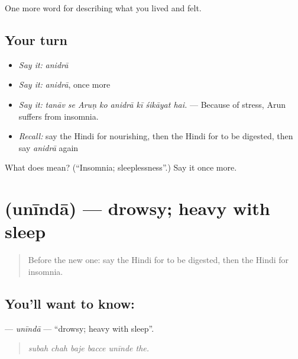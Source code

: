 \begin{grammarlens}[title={What you've built}]
One more word for describing what you lived and felt.
\end{grammarlens}

\subsection*{Your turn}
\begin{itemize}
\raggedright
  \item \emph{Say it:} \emph{anidrā}
  \item \emph{Say it:} \emph{anidrā}, once more
  \item \emph{Say it:} \emph{tanāv se Aruṇ ko anidrā kī śikāyat hai.} — Because of stress, Arun suffers from insomnia.
  \item \emph{Recall:} say the Hindi for nourishing, then the Hindi for to be digested, then say \emph{anidrā} again
\end{itemize}

\begin{tcolorbox}[breakable,colback=teal!4,colframe=teal!35!black,title={Before you move on}]
What does  mean? (\textquotedblleft{}Insomnia; sleeplessness\textquotedblright{}.) Say it once more.
\end{tcolorbox}
\section[\texorpdfstring{\hi{उनींदा} (unīndā)}{उनींदा (unīndā)}]{ (unīndā) — drowsy; heavy with sleep}

\label{lesson:HI-C496-uninda}



\begin{quote}
Before the new one: say the Hindi for to be digested, then the Hindi for insomnia.
\end{quote}

\subsection*{You'll want to know: }
\textbf{} — \emph{unīndā} — \textquotedblleft{}drowsy; heavy with sleep\textquotedblright{}.

\begin{quote}
     
\end{quote}

\begin{quote}
\emph{subah chah baje bacce unīnde the.}
\end{quote}


